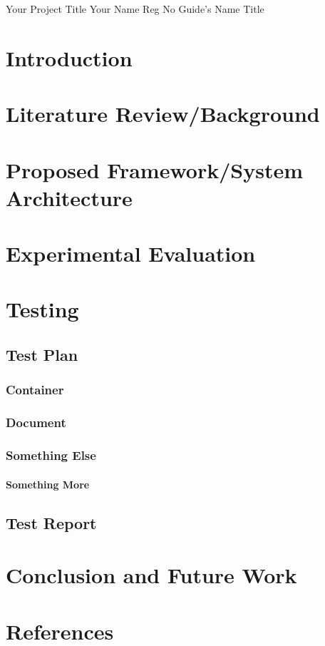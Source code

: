 \documentclass{vitmsprojectreport}
\begin{document}
\maketitlepage%
{Your Project Title}%
{Your Name}%
{Reg No}%
{Guide's Name}%
{Title}%

\tableofcontents  %
\clearpage
\listoffigures    %
\clearpage
\listoftables     %
\clearpage

\chapter{Introduction}

\chapter{Literature Review/Background}

\chapter{Proposed Framework/System Architecture}

\chapter{Experimental Evaluation}

\chapter{Testing}

\section{Test Plan}

\subsection{Container}

\subsection{Document}

\subsection{Something Else}

\subsubsection{Something More}

\section{Test Report}

\chapter{Conclusion and Future Work}

\chapter{References}
\end{document}

